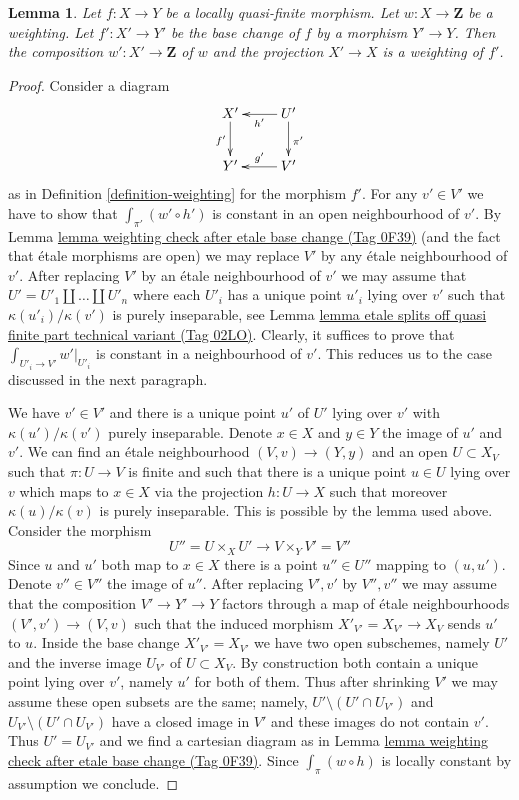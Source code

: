 \documentclass{amsart}
\theoremstyle{plain}
\newtheorem{lemma}[subsection]{Lemma}
\theoremstyle{definition}
\theoremstyle{remark}
\numberwithin{equation}{subsection}
\begin{document}
\begin{lemma}
\label{lemma-weighting-base-change}
Let $f : X \to Y$ be a locally quasi-finite morphism.
Let $w : X \to \mathbf{Z}$ be a weighting. Let $f' : X' \to Y'$
be the base change of $f$ by a morphism $Y' \to Y$. Then the
composition $w' : X' \to \mathbf{Z}$ of $w$ and the projection $X' \to X$
is a weighting of $f'$.
\end{lemma}

\begin{proof}
Consider a diagram
$$
\xymatrix{
X' \ar[d]_{f'} & U' \ar[l]^{h'} \ar[d]^{\pi'} \\
Y' & V' \ar[l]_{g'}
}
$$
as in Definition \ref{definition-weighting} for the morphism $f'$.
For any $v' \in V'$ we have to show that $\int_{\pi'} (w' \circ h')$ is
constant in an open neighbourhood of $v'$. By
Lemma \href{https://stacks.math.columbia.edu/tag/0F39}{lemma weighting check after etale base change (Tag 0F39)}
(and the fact that \'etale morphisms are open)
we may replace $V'$ by any \'etale neighbourhood of $v'$.
After replacing $V'$ by an \'etale neighbourhood of $v'$
we may assume that $U' = U'_1 \amalg \ldots \amalg U'_n$
where each $U'_i$ has a unique point $u'_i$ lying over $v'$
such that $\kappa(u'_i)/\kappa(v')$ is purely inseparable,
see Lemma \href{https://stacks.math.columbia.edu/tag/02LO}{lemma etale splits off quasi finite part technical variant (Tag 02LO)}.
Clearly, it suffices to prove that $\int_{U'_i \to V'} w'|_{U'_i}$
is constant in a neighbourhood of $v'$.
This reduces us to the case discussed in the next paragraph.

\medskip\noindent
We have $v' \in V'$ and there is a unique point $u'$ of $U'$
lying over $v'$ with $\kappa(u')/\kappa(v')$ purely inseparable.
Denote $x \in X$ and $y \in Y$ the image of $u'$ and $v'$.
We can find an \'etale neighbourhood $(V, v) \to (Y, y)$
and an open $U \subset X_V$ such that $\pi : U \to V$ is finite
and such that there is a unique point $u \in U$ lying over $v$
which maps to $x \in X$ via the projection $h : U \to X$
such that moreover $\kappa(u)/\kappa(v)$ is
purely inseparable. This is possible by the lemma used above.
Consider the morphism
$$
U'' = U \times_X U' \longrightarrow V \times_Y V' = V''
$$
Since $u$ and $u'$ both map to $x \in X$ there is a point
$u'' \in U''$ mapping to $(u, u')$. Denote $v'' \in V''$
the image of $u''$. After replacing $V', v'$ by $V'', v''$ 
we may assume that the composition $V' \to Y' \to Y$ factors
through a map of \'etale neighbourhoods $(V', v') \to (V, v)$
such that the induced morphism $X'_{V'} = X_{V'} \to X_V$ sends
$u'$ to $u$. Inside the base change $X'_{V'} = X_{V'}$ we have
two open subschemes, namely $U'$ and the inverse image $U_{V'}$ of
$U \subset X_V$. By construction both contain a unique point lying
over $v'$, namely $u'$ for both of them.
Thus after shrinking $V'$ we may assume these open subsets
are the same; namely, $U' \setminus (U' \cap U_{V'})$ and
$U_{V'} \setminus (U' \cap U_{V'})$ have
a closed image in $V'$ and these images do not contain $v'$.
Thus $U' = U_{V'}$ and we find a cartesian diagram as in
Lemma \href{https://stacks.math.columbia.edu/tag/0F39}{lemma weighting check after etale base change (Tag 0F39)}.
Since $\int_\pi (w \circ h)$ is locally constant
by assumption we conclude.
\end{proof}
\end{document}

